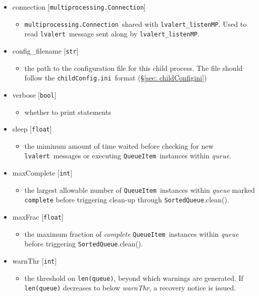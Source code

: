 \documentclass{article}
\newcommand{\multiprocessingConnection}{\texttt{multiprocessing.Connection}}
\newcommand{\alert}{\texttt{lvalert}}
\newcommand{\lvalertListenMP}{\texttt{lvalert\_listenMP}}
\newcommand{\SortedQueue}{\texttt{SortedQueue}}
\newcommand{\QueueItem}{\texttt{QueueItem}}
\newcommand{\childConfigini}{\texttt{childConfig.ini}}
\newcommand{\pythonint}{\texttt{int}}
\newcommand{\pythonfloat}{\texttt{float}}
\newcommand{\pythonstr}{\texttt{str}}
\newcommand{\pythonbool}{\texttt{bool}}
\begin{document}
\begin{itemize}
    \item{connection [\multiprocessingConnection]
        \begin{itemize}
            \item{\multiprocessingConnection~shared with \lvalertListenMP. Used to read \alert~message sent along by \lvalertListenMP.}
        \end{itemize}
         }
    \item{config\_filename [\pythonstr]
        \begin{itemize}
            \item{the path to the configuration file for this child process. The file should follow the \childConfigini~format (\S\ref{sec: childConfigini})}
        \end{itemize}
         }
    \item{verbose [\pythonbool]
        \begin{itemize}
            \item{whether to print statements}
        \end{itemize}
         }
    \item{sleep [\pythonfloat]
        \begin{itemize}
            \item{the miminum amount of time waited before checking for new \alert~messages or executing \QueueItem~instances within \textit{queue}.}
        \end{itemize}
         }
    \item{maxComplete [\pythonint]
        \begin{itemize}
            \item{the largest allowable number of \QueueItem~instances within \textit{queue} marked \texttt{complete} before triggering clean-up through \SortedQueue.clean().}
        \end{itemize}
         }
    \item{maxFrac [\pythonfloat]
        \begin{itemize}
            \item{the maximum fraction of \textit{complete} \QueueItem~instances within \textit{queue} before triggering \SortedQueue.clean().}
        \end{itemize}
         }
    \item{warnThr [\pythonint]
        \begin{itemize}
            \item{the threshold on \texttt{len(queue)}, beyond which warnings are generated. If \texttt{len(queue)} decreases to below \textit{warnThr}, a recovery notice is issued.}

\end{itemize}}
\end{itemize}
\end{document}
